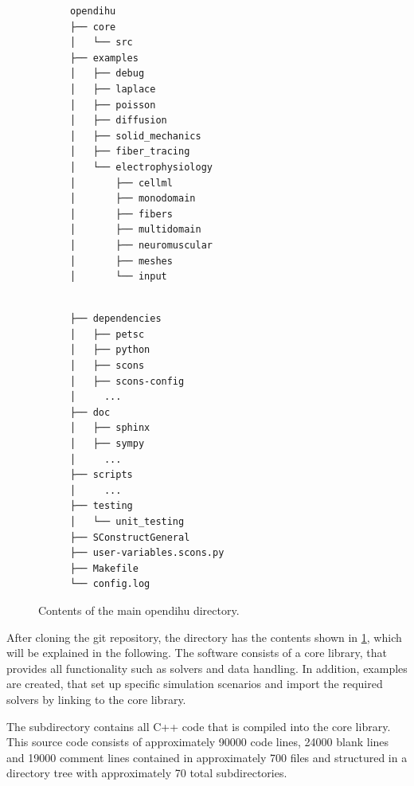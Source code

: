 \begin{figure}
\centering

\begin{framed}
\begin{subfigure}[t]{0.45\textwidth}%
\begin{Verbatim}[fontsize=\small]
opendihu
├── core
│   └── src
├── examples
│   ├── debug
│   ├── laplace
│   ├── poisson
│   ├── diffusion
│   ├── solid_mechanics
│   ├── fiber_tracing
│   └── electrophysiology
│       ├── cellml
│       ├── monodomain
│       ├── fibers
│       ├── multidomain
│       ├── neuromuscular
│       ├── meshes
│       └── input

\end{Verbatim}
\end{subfigure}
\begin{subfigure}[t]{0.45\textwidth}%
\begin{Verbatim}[fontsize=\small]

├── dependencies
│   ├── petsc
│   ├── python
│   ├── scons
│   ├── scons-config
│     ...
├── doc
│   ├── sphinx
│   ├── sympy
│     ...
├── scripts
│     ...
├── testing
│   └── unit_testing
├── SConstructGeneral
├── user-variables.scons.py
├── Makefile
└── config.log
\end{Verbatim}
\end{subfigure}
\end{framed}
\caption{Contents of the main opendihu directory.}%
\label{fig:directory_structure}%
\end{figure}

After cloning the git repository, the directory has the contents shown in \cref{fig:directory_structure}, which will be explained in the following.
The software consists of a core library, that provides all functionality such as solvers and data handling. In addition, examples are created, that set up specific simulation scenarios and import the required solvers by linking to the core library. 

The subdirectory  contains all C++ code that is compiled into the core library. This source code consists of approximately \num{90000} code lines, \num{24000} blank lines and \num{19000} comment lines contained in approximately 700 files and structured in a directory tree with approximately 70 total subdirectories.

